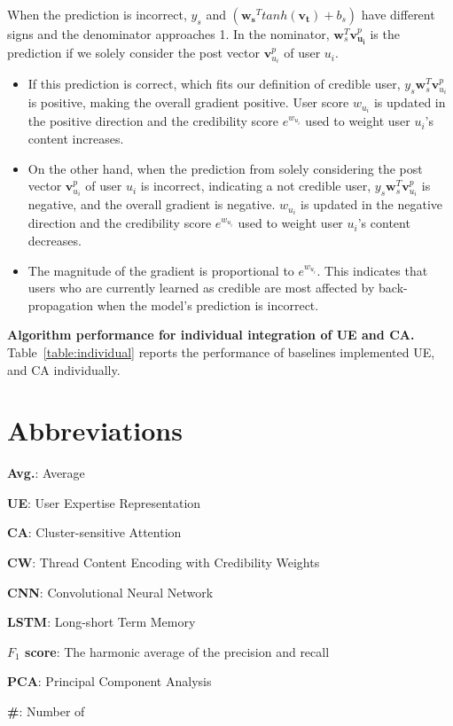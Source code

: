 \documentclass{bmcart}
\begin{document}
When the prediction is incorrect, $y_s$ and $(\boldsymbol{w_s}^T tanh(\boldsymbol{v_t})+b_s)$ have different signs and the denominator approaches 1. In the nominator, $\boldsymbol{w}_{s}^T \boldsymbol{v}^{p}_{\boldsymbol{u_i}}$ is the prediction if we solely consider the post vector $\boldsymbol{v}^{p}_{u_i}$ of user $u_i$. 
\begin{itemize}
    \item If this prediction is correct, which fits our definition of credible user, ${y_s}\boldsymbol{w}_{s}^T \boldsymbol{v}^{p}_{u_{i}}$ is positive, making the overall gradient positive. User score $w_{u_i}$ is updated in the positive direction and the credibility score $e^{w_{u_i}}$ used to weight user $u_i$'s content increases.
    \item On the other hand, when the prediction from solely considering the post vector $\boldsymbol{v}^{p}_{u_{i}}$ of user $u_i$ is incorrect, indicating a not credible user, ${y_s}\boldsymbol{w}_{s}^T \boldsymbol{v}^{p}_{u_{i}}$ is negative, and the overall gradient is negative. $w_{u_i}$ is updated in the negative direction and the credibility score $e^{w_{u_i}}$ used to weight user $u_i$'s content decreases.
    \item The magnitude of the gradient is proportional to $e^{w_{u_i}}$. This indicates that users who are currently learned as credible are most affected by back-propagation when the model's prediction is incorrect.
\end{itemize}

{\bf Algorithm performance for individual integration of UE and CA.}
Table~\ref{table:individual} reports the performance of baselines implemented UE, and CA individually.

\section*{Abbreviations}
\begin{flushleft}
\textbf{Avg.}: Average

\textbf{UE}: User Expertise Representation

\textbf{CA}: Cluster-sensitive Attention

\textbf{CW}: Thread Content Encoding with Credibility Weights

\textbf{CNN}: Convolutional Neural Network

\textbf{LSTM}: Long-short Term Memory

\textbf{$F_1$ score}: The harmonic average of the precision and recall

\textbf{PCA}: Principal Component Analysis

\textbf{\#}: Number of
\end{flushleft}
\end{document}
